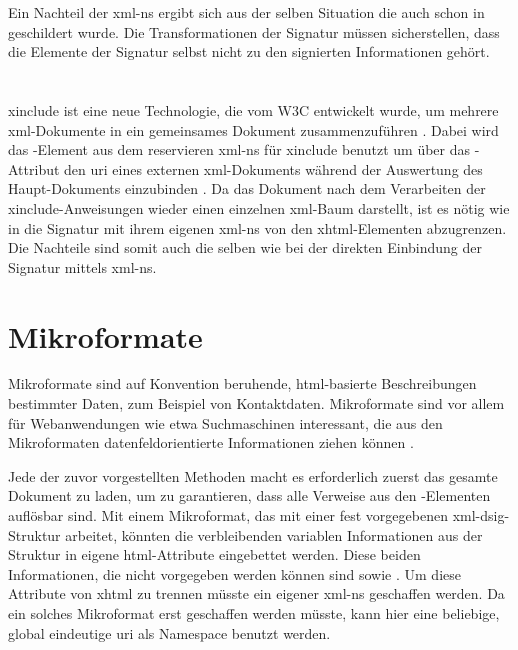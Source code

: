

Ein Nachteil der \gls{xml-ns} ergibt sich aus der selben Situation die auch schon in  geschildert wurde. Die
Transformationen der Signatur müssen sicherstellen, dass die Elemente der Signatur selbst nicht zu den signierten Informationen gehört.

\section{}
\label{sec:Signaturbindung:XInclude}
\gls{xinclude} ist eine neue Technologie, die vom W3C entwickelt wurde, um mehrere \gls{xml}-Dokumente in ein gemeinsames Dokument zusammenzuführen
\cite{xinclude:w3c}. Dabei wird das -Element aus dem reservieren \gls{xml-ns} für \gls{xinclude} benutzt um über das
-Attribut den \gls{uri} eines externen \gls{xml}-Dokuments während der Auswertung des Haupt-Dokuments einzubinden \cite{xml:oreilly}. Da
das Dokument nach dem Verarbeiten der \gls{xinclude}-Anweisungen wieder einen einzelnen \gls{xml}-Baum darstellt, ist es nötig wie in
 die Signatur mit ihrem eigenen \gls{xml-ns} von den \gls{xhtml}-Elementen abzugrenzen. Die Nachteile sind somit auch die
selben wie bei der direkten Einbindung der Signatur mittels \gls{xml-ns}.



\section{Mikroformate}
Mikroformate sind auf Konvention beruhende, \gls{html}-basierte Beschreibungen bestimmter Daten, zum Beispiel von Kontaktdaten. Mikroformate sind vor allem für
Webanwendungen wie etwa Suchmaschinen interessant, die aus den Mikroformaten datenfeldorientierte Informationen ziehen können \cite{mikroformate}.

Jede der zuvor vorgestellten Methoden macht es erforderlich zuerst das gesamte Dokument zu laden, um zu garantieren, dass alle Verweise aus den
-Elementen auflösbar sind. Mit einem Mikroformat, das mit einer fest vorgegebenen \gls{xml-dsig}-Struktur arbeitet, könnten die verbleibenden
variablen Informationen aus der Struktur in eigene \gls{html}-Attribute eingebettet werden. Diese beiden Informationen, die nicht vorgegeben werden können sind
 sowie . Um diese Attribute von \gls{xhtml} zu trennen müsste ein eigener \gls{xml-ns} geschaffen werden. Da ein
solches Mikroformat erst geschaffen werden müsste, kann hier eine beliebige, global eindeutige \gls{uri} als Namespace benutzt werden.

